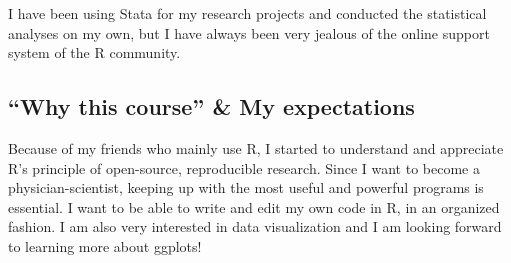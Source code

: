 \documentclass[
]{article}
\begin{document}
I have been using Stata for my research projects and conducted the
statistical analyses on my own, but I have always been very jealous of
the online support system of the R community.

\hypertarget{why-this-course-my-expectations}{%
\subsection{``Why this course'' \& My
expectations}\label{why-this-course-my-expectations}}

Because of my friends who mainly use R, I started to understand and
appreciate R's principle of open-source, reproducible research. Since I
want to become a physician-scientist, keeping up with the most useful
and powerful programs is essential. I want to be able to write and edit
my own code in R, in an organized fashion. I am also very interested in
data visualization and I am looking forward to learning more about
ggplots!
\end{document}
